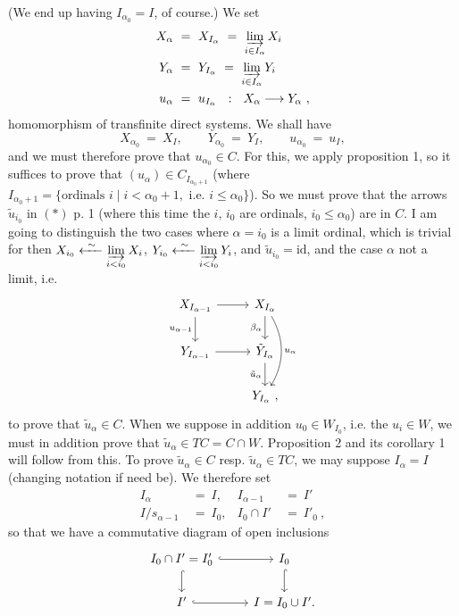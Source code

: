 
(We end up having $I_{\alpha_0} = I$, of course.) We set
\[
\begin{aligned}
X_{\alpha} \ &= \ X_{I_{\alpha}} \ = \ \varinjlim_{i \in I_{\alpha}} X_i \\
Y_{\alpha} \ &= \ Y_{I_{\alpha}} \ = \ \varinjlim_{i \in I_{\alpha}} Y_i \\
u_{\alpha} \ &= \ u_{I_{\alpha}} \ \ :\ \ X_{\alpha} \longrightarrow Y_{\alpha}\ ,
\end{aligned}
\]
homomorphism of transfinite direct systems. We shall have
\[
X_{\alpha_0} \ = \ X_I, \qquad Y_{\alpha_0} \ = \ Y_I, \qquad u_{\alpha_0} \ = \ u_I,
\]
and we must therefore prove that $u_{\alpha_0} \in C$. For this, we apply proposition 1, so it suffices to prove that $(u_{\alpha}) \in C_{I_{\alpha_0+1}}$ (where $I_{\alpha_0+1} = \{\text{ordinals } i \mid i < \alpha_0 + 1, \text{ i.e. } i \leq \alpha_0\}$). So we must prove that the arrows $\tilde{u}_{i_0}$ in $(*)$ p. 1 (where this time the $i$, $i_0$ are ordinals, $i_0 \leq \alpha_0$) are in $C$. I am going to distinguish the two cases where $\alpha = i_0$ is a limit ordinal, which is trivial for then $X_{i_0} \xleftarrow{\ \sim\ } \varinjlim\limits_{i < i_0} X_i$, $Y_{i_0} \xleftarrow{\ \sim\ } \varinjlim\limits_{i < i_0} Y_i$, and $\tilde{u}_{i_0} = \mathrm{id}$, and the case $\alpha$ not a limit, i.e.
\[
\begin{tikzcd}
X_{I_{\alpha-1}} \arrow[r] \arrow[d, "u_{\alpha-1}"'] & X_{I_{\alpha}} \arrow[d, "\beta_{\alpha}"'] \arrow[dd, bend left=30, "u_{\alpha}"] \\
Y_{I_{\alpha-1}} \arrow[r] & \tilde{Y}_{I_{\alpha}} \arrow[d, "\tilde{u}_{\alpha}"'] \\
& Y_{I_{\alpha}}\ ,
\end{tikzcd}
\]
to prove that $\tilde{u}_{\alpha} \in C$. When we suppose in addition $u_0 \in W_{I_0}$, i.e. the $u_i \in W$, we must in addition prove that $\tilde{u}_{\alpha} \in TC = C \cap W$. Proposition 2 and its corollary 1 will follow from this. To prove $\tilde{u}_{\alpha} \in C$ resp. $\tilde{u}_{\alpha} \in TC$, we may suppose $I_{\alpha} = I$ (changing notation if need be). We therefore set
\[
\begin{aligned}
I_{\alpha} \ &= \ I, & I_{\alpha-1} \ &= \ I' \\
I/s_{\alpha-1} \ &= \ I_0, & I_0 \cap I' \ &= \ I'_0\ ,
\end{aligned}
\]
so that we have a commutative diagram of open inclusions
\[
\begin{tikzcd}
I_0 \cap I' = I'_0 \arrow[r, hook] \arrow[d, hook] & I_0 \arrow[d, hook] \\
I' \arrow[r, hook] & I = I_0 \cup I'.
\end{tikzcd}
\]
